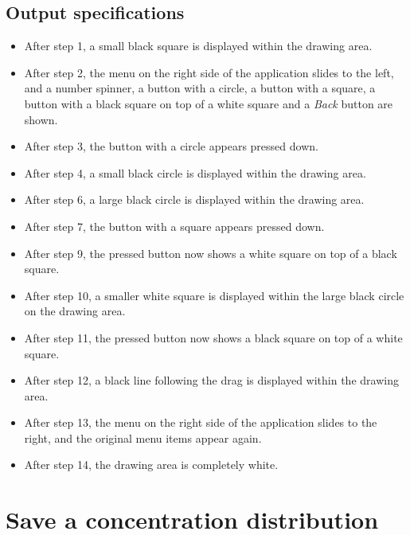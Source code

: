 \subsection*{Output specifications}
\begin{itemize}
\item After step 1, a small black square is displayed within the drawing area.
\item After step 2,  the menu on the right side of the application slides to the left, and a number spinner, a button with a circle, a button with a square, a button with a black square on top of a white square and a \emph{Back} button are shown.
\item After step 3, the button with a circle appears pressed down.
\item After step 4, a small black circle is displayed within the drawing area.

\item After step 6, a large black circle is displayed within the drawing area.
\item After step 7, the button with a square appears pressed down.
\item After step 9, the pressed button now shows a white square on top of a black square.
\item After step 10, a smaller white square is displayed within the large black circle on the drawing area.

\item After step 11, the pressed button now shows a black square on top of a white square.
\item After step 12, a black line following the drag is displayed within the drawing area.
\item After step 13, the menu on the right side of the application slides to the right, and the original menu items appear again.
\item After step 14, the drawing area is completely white.
\end{itemize}

\section{Save a concentration distribution}

